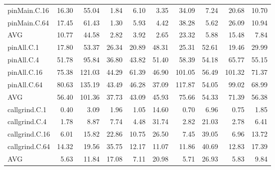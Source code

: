 \begin{table}[]
\begin{center}
\begin{tabular}{lrrrrrrrrr}
 pinMain.C.16   & 16.30 &  55.04 &  1.84 &  6.10 &  3.35 &  34.09 &  7.24 &  20.68 & 10.70 \\
 pinMain.C.64   & 17.45 &  61.43 &  1.30 &  5.93 &  4.42 &  38.28 &  5.62 &  26.09 & 10.94 \\
 AVG            & 10.77 &  44.58 &  2.82 &  3.92 &  2.65 &  23.32 &  5.88 &  15.48 &  7.84 \\
 pinAll.C.1     & 17.80 &  53.37 & 26.34 & 20.89 & 48.31 &  25.31 & 52.61 &  19.46 & 29.99 \\
 pinAll.C.4     & 51.78 &  95.84 & 36.80 & 43.82 & 51.40 &  58.39 & 54.18 &  65.77 & 55.15 \\
 pinAll.C.16    & 75.38 & 121.03 & 44.29 & 61.39 & 46.90 & 101.05 & 56.49 & 101.32 & 71.37 \\
 pinAll.C.64    & 80.63 & 135.19 & 43.49 & 46.28 & 37.09 & 117.87 & 54.05 &  99.02 & 68.99 \\
 AVG            & 56.40 & 101.36 & 37.73 & 43.09 & 45.93 &  75.66 & 54.33 &  71.39 & 56.38 \\
 callgrind.C.1  &  0.40 &   3.09 &  1.96 &  1.05 & 14.60 &   0.70 &  6.96 &   0.75 &  1.85 \\
 callgrind.C.4  &  1.78 &   8.87 &  7.74 &  4.48 & 31.74 &   2.82 & 21.03 &   2.78 &  6.41 \\
 callgrind.C.16 &  6.01 &  15.82 & 22.86 & 10.75 & 26.50 &   7.45 & 39.05 &   6.96 & 13.72 \\
 callgrind.C.64 & 14.32 &  19.56 & 35.75 & 12.17 & 11.07 &  11.86 & 40.69 &  12.83 & 17.39 \\
 AVG            &  5.63 &  11.84 & 17.08 &  7.11 & 20.98 &   5.71 & 26.93 &   5.83 &  9.84 \\
\hline
\end{tabular}
\end{center}
\end{table}

\fi


\iftrue

